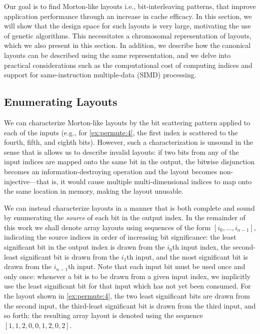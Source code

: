 Our goal is to find Morton-like layouts i.e., bit-interleaving patterns, that improve application performance through an increase in cache efficacy. In this section, we will show that the design space for such layouts is very large, motivating the use of genetic algorithms. This necessitates a chromosomal representation of layouts, which we also present in this section. In addition, we describe how the canonical layouts can be described using the same representation, and we delve into practical considerations such as the computational cost of computing indices and support for same-instruction multiple-data (SIMD) processing.

\subsection{Enumerating Layouts}

\label{sec:bijections:enumerating}

We can characterize Morton-like layouts by the bit scattering pattern applied to each of the inputs (e.g., for \cref{ex:permute:4}, the first index is scattered to the fourth, fifth, and eighth bits). However, such a characterization is unsound in the sense that is allows us to describe invalid layouts: if two bits from any of the input indices are mapped onto the same bit in the output, the bitwise disjunction becomes an information-destroying operation and the layout becomes non-injective---that is, it would cause multiple multi-dimensional indices to map onto the same location in memory, making the layout unusable.

We can instead characterize layouts in a manner that is both complete and sound by enumerating the \emph{source} of each bit in the output index. In the remainder of this work we shall denote array layouts using sequences of the form $[i_0, \ldots, i_{n-1}]$, indicating the source indices in order of increasing bit significance: the least significant bit in the output index is drawn from the $i_0$th input index, the second-least significant bit is drawn from the $i_1$th input, and the most significant bit is drawn from the $i_{n-1}$th input. Note that each input bit must be used once and only once: whenever a bit is to be drawn from a given input index, we implicitly use the least significant bit for that input which has not yet been consumed. For the layout shown in \cref{ex:permute:4}, the two least significant bits are drawn from the second input, the third-least significant bit is drawn from the third input, and so forth: the resulting array layout is denoted using the sequence $[1,1,2,0,0,1,2,0,2]$. 

